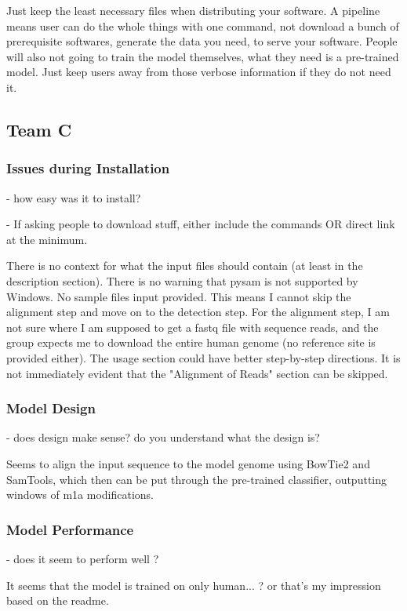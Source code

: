 \documentclass[paper=a4, fontsize=11pt]{scrartcl}
\numberwithin{equation}{section}    %
\numberwithin{figure}{section}      %
\numberwithin{table}{section}       %
\numberwithin{equation}{section}    %
\numberwithin{figure}{section}      %
\numberwithin{table}{section}       %
\begin{document}
Just keep the least necessary files when distributing your software. A pipeline means user can do the whole things with one command, not download a bunch of prerequisite softwares, generate the data you need, to serve your software.  People will also not going to train the model themselves, what they need is a pre-trained model. Just keep users away from those verbose information if they do not need it.

\subsection{Team C}

\subsubsection{Issues during Installation}
- how easy was it to install?

- If asking people to download stuff, either include the commands OR direct link at the minimum. 

There is no context for what the input files should contain (at least in the description section). There is no warning that pysam is not supported by Windows. No sample files input provided. This means I cannot skip the alignment step and move on to the detection step. For the alignment step, I am not sure where I am supposed to get a fastq file with sequence reads, and the group expects me to download the entire human genome (no reference site is provided either). The usage section could have better step-by-step directions. It is not immediately evident that the "Alignment of Reads" section can be skipped.

\subsubsection{Model Design}
- does design make sense? do you understand what the design is?

Seems to align the input sequence to the model genome using BowTie2 and SamTools, which then can be put through the pre-trained classifier, outputting windows of m1a modifications. 


\subsubsection{Model Performance}
- does it seem to perform well ?

It seems that the model is trained on only human... ? or that's my impression based on the readme. 
\end{document}
